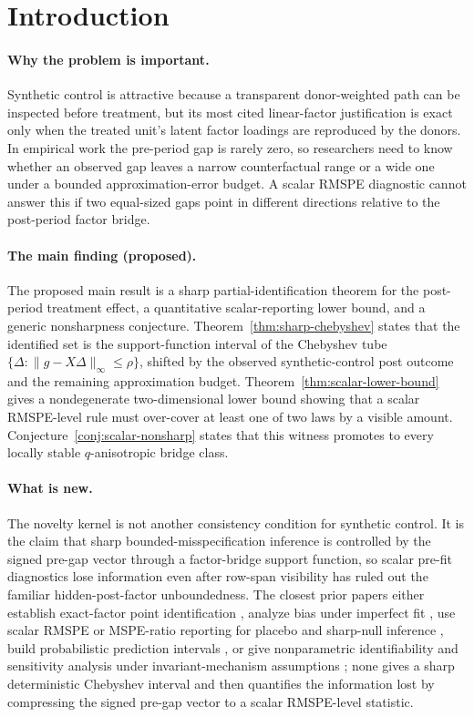 \documentclass[11pt]{article}
\theoremstyle{definition}
\theoremstyle{plain}
\theoremstyle{remark}
\begin{document}
\section{Introduction}
\paragraph{Why the problem is important.}
Synthetic control is attractive because a transparent donor-weighted path can be inspected before treatment, but its most cited linear-factor justification is exact only when the treated unit's latent factor loadings are reproduced by the donors. In empirical work the pre-period gap is rarely zero, so researchers need to know whether an observed gap leaves a narrow counterfactual range or a wide one under a bounded approximation-error budget. A scalar RMSPE diagnostic cannot answer this if two equal-sized gaps point in different directions relative to the post-period factor bridge.

\paragraph{The main finding (proposed).}
The proposed main result is a sharp partial-identification theorem for the post-period treatment effect, a quantitative scalar-reporting lower bound, and a generic nonsharpness conjecture. Theorem~\ref{thm:sharp-chebyshev} states that the identified set is the support-function interval of the Chebyshev tube \(\{\Delta:\|g-X\Delta\|_\infty\le\rho\}\), shifted by the observed synthetic-control post outcome and the remaining approximation budget. Theorem~\ref{thm:scalar-lower-bound} gives a nondegenerate two-dimensional lower bound showing that a scalar RMSPE-level rule must over-cover at least one of two laws by a visible amount. Conjecture~\ref{conj:scalar-nonsharp} states that this witness promotes to every locally stable \(q\)-anisotropic bridge class.

\paragraph{What is new.}
The novelty kernel is not another consistency condition for synthetic control. It is the claim that sharp bounded-misspecification inference is controlled by the signed pre-gap vector through a factor-bridge support function, so scalar pre-fit diagnostics lose information even after row-span visibility has ruled out the familiar hidden-post-factor unboundedness. The closest prior papers either establish exact-factor point identification \citep{AbadieDiamondHainmueller2010}, analyze bias under imperfect fit \citep{FermanPinto2021,BenMichaelFellerRothstein2021}, use scalar RMSPE or MSPE-ratio reporting for placebo and sharp-null inference \citep{Abadie2021,FirpoPossebom2018}, build probabilistic prediction intervals \citep{CattaneoFengTitiunik2021,ChernozhukovWuthrichZhu2021}, or give nonparametric identifiability and sensitivity analysis under invariant-mechanism assumptions \citep{ZeitlerVlontzosGilliganLee2023}; none gives a sharp deterministic Chebyshev interval and then quantifies the information lost by compressing the signed pre-gap vector to a scalar RMSPE-level statistic.
\end{document}
